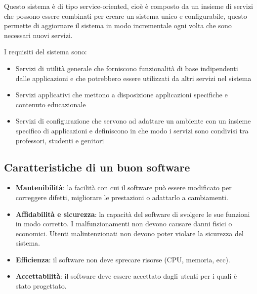 \documentclass[a4paper]{article}
\begin{document}
\begin{itemize}
    Questo sistema è di tipo service-oriented, cioè è composto da un insieme di servizi
    che possono essere combinati per creare un sistema unico e configurabile, questo
    permette di aggiornare il sistema in modo incrementale ogni volta che sono necessari
    nuovi servizi.

    I requisiti del sistema sono:
    \begin{itemize}
      \item Servizi di utilità generale che forniscono funzionalità di base indipendenti
        dalle applicazioni e che potrebbero essere utilizzati da altri servizi nel sistema

      \item Servizi applicativi che mettono a disposizione applicazioni specifiche e 
        contenuto educazionale

      \item Servizi di configurazione che servono ad adattare un ambiente con un insieme
        specifico di applicazioni e definiscono in che modo i servizi sono condivisi tra
        professori, studenti e genitori
    \end{itemize}
\end{itemize}

\subsection{Caratteristiche di un buon software}
\begin{itemize}
  \item \textbf{Mantenibilità}: la facilità con cui il software può essere modificato
  per correggere difetti, migliorare le prestazioni o adattarlo a cambiamenti.


  \item \textbf{Affidabilità e sicurezza}: la capacità del software di svolgere le sue
  funzioni in modo corretto. I malfunzionamenti non devono causare danni fisici o economici.
  Utenti malintenzionati non devono poter violare la sicurezza del sistema.
  
  \item \textbf{Efficienza}: il software non deve sprecare risorse (CPU, memoria, ecc).

  \item \textbf{Accettabilità}: il software deve essere accettato dagli utenti per i quali
  è stato progettato.
\end{itemize}
\end{document}
